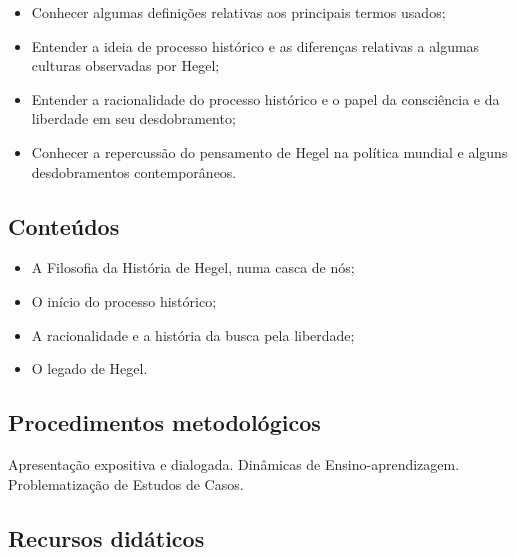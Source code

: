 \documentclass[oneside,a4paper,12pt]{article}
\begin{document}
      \begin{itemize}
      
		\item Conhecer algumas definições relativas aos principais termos usados;
		\item Entender a ideia de processo histórico e as diferenças relativas a algumas culturas observadas por Hegel;
		\item Entender a racionalidade do processo histórico e o papel da consciência e da liberdade em seu desdobramento;
		\item Conhecer a repercussão do pensamento de Hegel na política mundial e alguns desdobramentos contemporâneos.
      
      \end{itemize}
  
  \begin{snugshade}
  \section{Conteúdos} %
  \end{snugshade}

      \begin{itemize}
      
		\item A Filosofia da História de Hegel, numa casca de nós; %
		\item O início do processo histórico;
		\item A racionalidade e a história da busca pela liberdade;
		\item O legado de Hegel.
      
      \end{itemize}

  \begin{snugshade}
  \section{Procedimentos metodológicos} %
  \end{snugshade}

	Apresentação expositiva e dialogada. Dinâmicas de Ensino-aprendizagem. Problematização de Estudos de Casos.
	  
  \begin{snugshade}
  \section{Recursos didáticos} %
  \end{snugshade}
  
\end{document}
